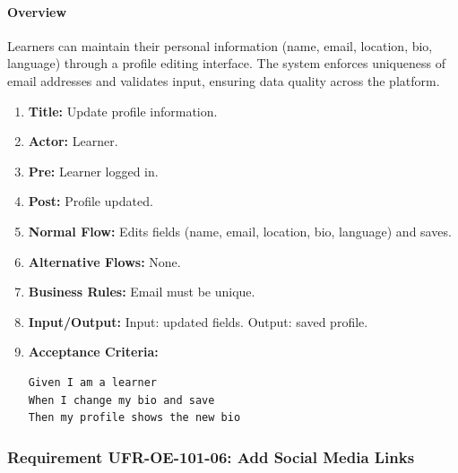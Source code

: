 \paragraph{Overview}
Learners can maintain their personal information (name, email, location, bio, language) through a profile editing interface. The system enforces uniqueness of email addresses and validates input, ensuring data quality across the platform.
\begin{enumerate}[label=\textbf{\arabic*.}]
\item \textbf{Title:} Update profile information.
\item \textbf{Actor:} Learner.
\item \textbf{Pre:} Learner logged in.
\item \textbf{Post:} Profile updated.
\item \textbf{Normal Flow:} Edits fields (name, email, location, bio, language) and saves.
\item \textbf{Alternative Flows:} None.
\item \textbf{Business Rules:} Email must be unique.
\item \textbf{Input/Output:} Input: updated fields. Output: saved profile.
\item \textbf{Acceptance Criteria:}
    \begin{verbatim}
Given I am a learner
When I change my bio and save
Then my profile shows the new bio
    \end{verbatim}
\end{enumerate}

\subsubsection{Requirement UFR-OE-101-06: Add Social Media Links}
